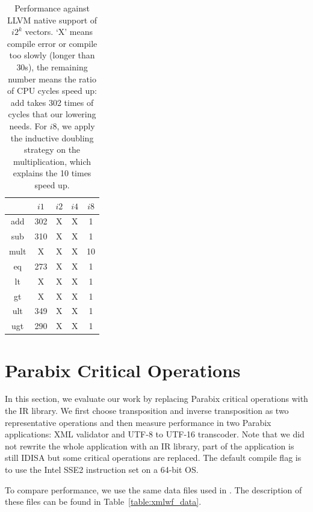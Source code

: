 \begin{table}[h]
\centering
\begin{tabular}{|c|c|c|c|c|}
\hline
     & $i1$ & $i2$ & $i4$ & $i8$ \\ \hline
add  & 302  & X    & X    & 1\\ \hline
sub  & 310  & X    & X    & 1\\ \hline
mult & X    & X    & X    & 10\\ \hline
eq   & 273  & X    & X    & 1\\ \hline
lt   & X    & X    & X    & 1\\ \hline
gt   & X    & X    & X    & 1\\ \hline
ult  & 349  & X    & X    & 1\\ \hline
ugt  & 290  & X    & X    & 1\\ \hline
\end{tabular}
\caption[Performance against LLVM native support for $i2^k$ vectors]{Performance against LLVM native support of $i2^k$ vectors. `X' means compile error or compile too slowly (longer than 30s), the remaining number means the ratio of CPU cycles speed up: add takes 302 times of cycles that our lowering needs. For $i8$, we apply the inductive doubling strategy on the multiplication, which explains the 10 times speed up. }
\label{table:vector_perf_LLVM}
\end{table}

\section{Parabix Critical Operations}
In this section, we evaluate our work by replacing Parabix critical operations with the IR library. We first choose transposition and inverse transposition as two representative operations and then measure performance in two Parabix applications: XML validator and UTF-8 to UTF-16 transcoder. Note that we did not rewrite the whole application with an IR library, part of the application is still IDISA but some critical operations are replaced. The default compile flag is to use the Intel SSE2 instruction set on a 64-bit OS.

To compare performance, we use the same data files used in \cite{rob_xml}. The description of these files can be found in Table~\ref{table:xmlwf_data}.

